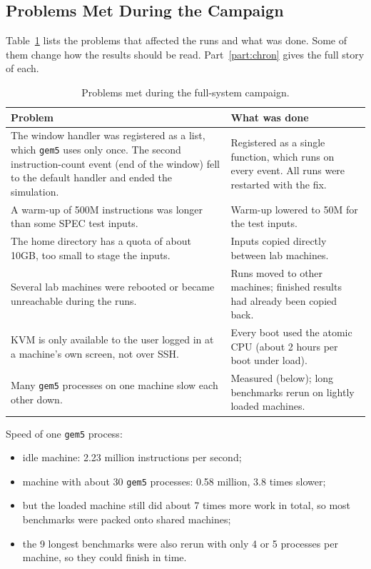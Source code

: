 \subsection{Problems Met During the Campaign}
Table~\ref{tab:campaign_issues} lists the problems that affected the runs and what was done. Some of them change how the results should be read. Part~\ref{part:chron} gives the full story of each.

\begin{table}[H]
\centering
\small
\caption{Problems met during the full-system campaign.}
\label{tab:campaign_issues}
\begin{tabularx}{\textwidth}{X X}
\toprule
\textbf{Problem} & \textbf{What was done} \\
\midrule
The window handler was registered as a list, which \texttt{gem5} uses only once. The second instruction-count event (end of the window) fell to the default handler and ended the simulation. & Registered as a single function, which runs on every event. All runs were restarted with the fix. \\
A warm-up of 500M instructions was longer than some SPEC test inputs. & Warm-up lowered to 50M for the test inputs. \\
The home directory has a quota of about 10GB, too small to stage the inputs. & Inputs copied directly between lab machines. \\
Several lab machines were rebooted or became unreachable during the runs. & Runs moved to other machines; finished results had already been copied back. \\
KVM is only available to the user logged in at a machine's own screen, not over SSH. & Every boot used the atomic CPU (about 2 hours per boot under load). \\
Many \texttt{gem5} processes on one machine slow each other down. & Measured (below); long benchmarks rerun on lightly loaded machines. \\
\bottomrule
\end{tabularx}
\end{table}

Speed of one \texttt{gem5} process:
\begin{itemize}
    \item idle machine: 2.23 million instructions per second;
    \item machine with about 30 \texttt{gem5} processes: 0.58 million, 3.8 times slower;
    \item but the loaded machine still did about 7 times more work in total, so most benchmarks were packed onto shared machines;
    \item the 9 longest benchmarks were also rerun with only 4 or 5 processes per machine, so they could finish in time.
\end{itemize}

